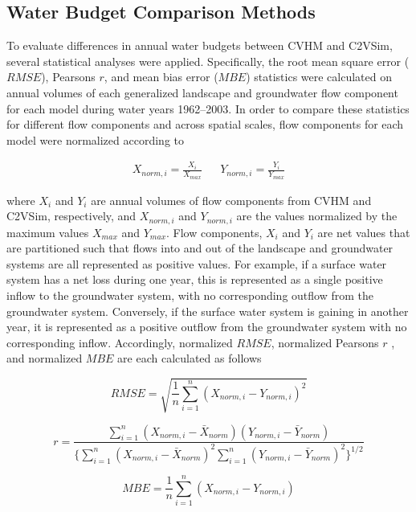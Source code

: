 \subsection{Water Budget Comparison Methods}

To evaluate differences in annual water budgets between CVHM and C2VSim, several statistical analyses were applied. Specifically, the root mean square error ($RMSE$), Pearsons $r$, and mean bias error ($MBE$) statistics were calculated on annual volumes of each generalized landscape and groundwater flow component for each model during water years 1962--2003. In order to compare these statistics for different flow components and across spatial scales, flow components for each model were normalized according to 

\begin{align}
X_{norm, i} = \frac{X_i}{X_{max}} && Y_{norm, i} = \frac{Y_i}{Y_{max}}
\end{align}

\noindent where $X_i$ and $Y_i$ are annual volumes of flow components from CVHM and C2VSim, respectively, and $X_{norm,i}$ and $Y_{norm,i}$ are the values normalized by the maximum values $X_{max}$ and $Y_{max}$. Flow components, $X_i$ and $Y_i$ are net values that are partitioned such that flows into and out of the landscape and groundwater systems are all represented as positive values. For example, if a surface water system has a net loss during one year, this is represented as a single positive inflow to the groundwater system, with no corresponding outflow from the groundwater system. Conversely, if the surface water system is gaining in another year, it is represented as a positive outflow from the groundwater system with no corresponding inflow.  Accordingly, normalized $RMSE$, normalized Pearsons $r$ , and normalized $MBE$ are each calculated as follows

\begin{equation}
RMSE = \sqrt{\frac{1}{n}\sum\limits_{i=1}^{n}{(X_{norm, i} -Y_{norm, i})^2}}
\end{equation}

\begin{equation}
r = \frac{\sum\limits_{i=1}^{n}{(X_{norm, i} -\bar{X}_{norm})}{(Y_{norm, i} -\bar{Y}_{norm})}}{\Bigg\{\sum\limits_{i=1}^{n}{(X_{norm, i} -\bar{X}_{norm})^2}\sum\limits_{i=1}^{n}{(Y_{norm, i} -\bar{Y}_{norm})^2}\Bigg\}^{1/2}}
\end{equation}

\begin{equation}
MBE = \frac{1}{n}\sum\limits_{i=1}^{n}{(X_{norm, i} -Y_{norm, i})}
\end{equation}

